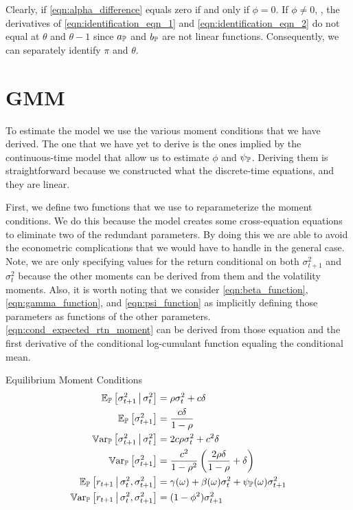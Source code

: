 \documentclass[11pt, letterpaper, twoside, final]{article}
\begin{document}
Clearly, if \cref{eqn:alpha_difference} equals zero if and only if $\phi = 0$.
If $\phi \neq 0$, , the derivatives of \cref{eqn:identification_eqn_1} and \cref{eqn:identification_eqn_2}  do not
equal at $\theta$ and $\theta-1$ since $a_{\mathbb{P}}$ and $b_{\mathbb{P}}$ are not linear functions.
Consequently, we can separately identify $\pi$ and $\theta$.

\section{GMM}\label{sec:GMM}

To estimate the model we use the various moment conditions that we have derived.
The one that we have yet to derive is the ones implied by the continuous-time model that allow us to estimate
$\phi$ and $\psi_{\mathbb{P}}$.
Deriving them is straightforward because we constructed what the discrete-time equations, and they are linear.

First, we define two functions that we use to reparameterize the moment conditions.
We do this because the model creates some cross-equation equations to eliminate two of the redundant parameters.
By doing this we are able to avoid the econometric complications that we would have to handle in the general
case.
Note, we are only specifying values for the return conditional on both $\sigma^2_{t+1}$ and $\sigma^2_t$ because
the other moments can be derived from them and the volatility moments.
Also, it is worth noting that we consider \cref{eqn:beta_function}, \cref{eqn:gamma_function}, and
\cref{eqn:psi_function} as implicitly defining those parameters as functions of the other parameters.
\cref{eqn:cond_expected_rtn_moment} can be derived from those equation and the first derivative of the conditional
log-cumulant function equaling the conditional mean.


\begin{defn}{Equilibrium Moment Conditions}
    \label{defn:equilibrium_moment_conditions}
    \begin{align}
        \label{eqn:cond_vol_mean}
        \E_{\PP}\left[\sigma^2_{t+1} \mvert \sigma^2_t \right]  &= \rho \sigma^2_t  + c \delta\\
%
        \label{eqn:global_vol_mean}
        \E_{\PP}\left[\sigma^2_{t+1}\right]  &= \frac{c \delta}{1 - \rho} \\
%
        \label{eqn:cond_vol_var}
        \Var_{\PP}\left[\sigma^2_{t+1} \mvert \sigma^2_t \right]  &=  2 c \rho \sigma^2_t  + c^2 \delta \\
%
        \label{eqn:global_vol_var}
        \Var_{\PP}\left[\sigma^2_{t+1} \right]  &=  \frac{c^2}{1 - \rho^2}  \left(\frac{2 \rho \delta}{1 - \rho}  +
        \delta \right)  \\
%
        \label{eqn:cond_expected_rtn_moment}
        \E_{\PP}\left[r_{t+1} \mvert \sigma^2_t, \sigma^2_{t+1}\right] &= \gamma(\omega) + \beta(\omega) \sigma^2_t +
        \psi_{\PP}(\omega) \sigma^2_{t+1} \\
%
        \label{eqn:cond_rtn_var}
        \Var_{\PP}\left[r_{t+1} \mvert \sigma^2_t, \sigma^2_{t+1}\right] &= (1 - \phi^2) \sigma^2_{t+1} 
\end{align}
\end{defn}
\end{document}
